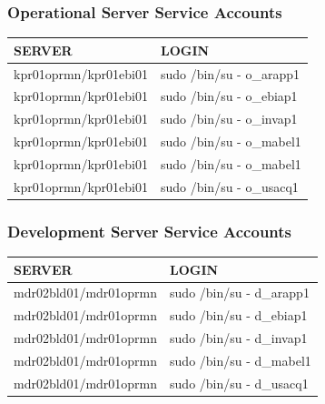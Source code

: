 \documentclass[12pt,twoside]{article}
\begin{document}
\subsubsection{Operational Server Service Accounts}
\label{sec:orgheadline10}
\footnotesize
\begin{center}
\begin{tabular}{ll}
\hline
\textbf{SERVER} & \textbf{LOGIN}\\
\hline
kpr01oprmn/kpr01ebi01 & sudo /bin/su - o\_arapp1\\
kpr01oprmn/kpr01ebi01 & sudo /bin/su - o\_ebiap1\\
kpr01oprmn/kpr01ebi01 & sudo /bin/su - o\_invap1\\
kpr01oprmn/kpr01ebi01 & sudo /bin/su - o\_mabel1\\
kpr01oprmn/kpr01ebi01 & sudo /bin/su - o\_mabel1\\
kpr01oprmn/kpr01ebi01 & sudo /bin/su - o\_usacq1\\
\hline
\end{tabular}
\end{center}

\normalsize
\subsubsection{Development Server Service Accounts}
\label{sec:orgheadline11}
\footnotesize
\begin{center}
\begin{tabular}{ll}
\hline
\textbf{SERVER} & \textbf{LOGIN}\\
\hline
mdr02bld01/mdr01oprmn & sudo /bin/su - d\_arapp1\\
mdr02bld01/mdr01oprmn & sudo /bin/su - d\_ebiap1\\
mdr02bld01/mdr01oprmn & sudo /bin/su - d\_invap1\\
mdr02bld01/mdr01oprmn & sudo /bin/su - d\_mabel1\\
mdr02bld01/mdr01oprmn & sudo /bin/su - d\_usacq1\\
\hline
\end{tabular}
\end{center}

\normalsize
\end{document}
